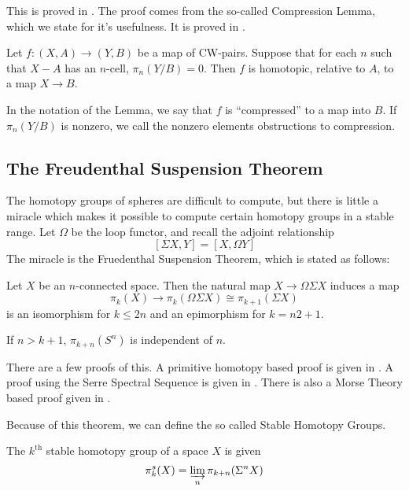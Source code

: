 This is proved in \cite[Thm~4.5]{HatcherAT}.  
The proof comes from the so-called Compression Lemma, which we state for it's usefulness.  It is proved in \cite[Thm~4.6]{HatcherAT}.

\begin{Lemma}
  Let $f:(X,A)\to (Y,B)$ be a map of CW-pairs.  Suppose that for each $n$ such that $X-A$ has an $n$-cell, $\pi_n(Y/B)=0$.  Then $f$ is homotopic, relative to $A$, to a map $X\to B$.  
\end{Lemma}

\begin{Def}
  In the notation of the Lemma, we say that $f$ is ``compressed'' to a map into $B$.  If $\pi_n(Y/B)$ is nonzero, we call the nonzero elements obstructions to compression.  
\end{Def}

\subsection{The Freudenthal Suspension Theorem}

The homotopy groups of spheres are difficult to compute, but there is little a miracle which makes it possible to compute certain homotopy groups in a stable range.  
Let $\Omega$ be the loop functor, and recall the adjoint relationship
\[[\Sigma X, Y]=[X, \Omega Y]\]
The miracle is the Fruedenthal Suspension Theorem, which is stated as follows:
\begin{Theorem}
  Let $X$ be an $n$-connected space.  
  Then the natural map $X\to \Omega\Sigma X$ induces a map 
  \[\pi_k(X)\to \pi_k(\Omega\Sigma X)\cong\pi_{k+1}(\Sigma X)\]
  is an isomorphism for $k\le 2n$ and an epimorphism for $k=n2+1$.  
\end{Theorem}
\begin{Cor}
  If $n>k+1$, $\pi_{k+n}(S^n)$ is independent of $n$.
\end{Cor}

There are a few proofs of this.  A primitive homotopy based proof is given in \cite[Cor~4.24]{HatcherAT}.  
A proof using the Serre Spectral Sequence is given in \cite[Ch~12]{MosherTengora}.  
There is also a Morse Theory based proof given in \cite[Cor~22.3]{MilnorMorse}.  


Because of this theorem, we can define the so called Stable Homotopy Groups.  


\begin{Def}
  The  $k^{\mbox{th}}$ stable homotopy group of a space $X$ is given
  \[\pi_k^s(X)=\varinjlim_n \pi_{k+n}(\Sigma^n X) \]
\end{Def}


